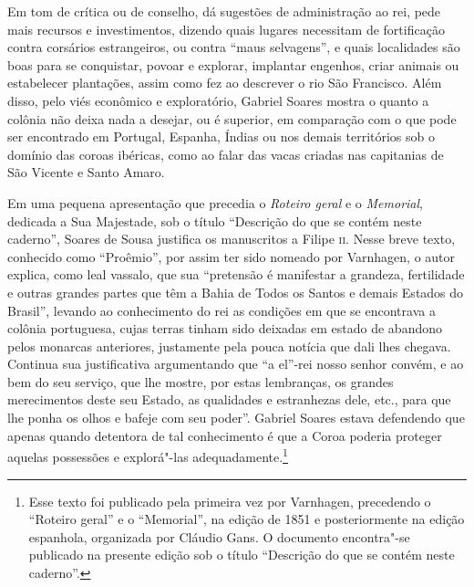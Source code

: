 \documentclass[12pt]{extarticle}
\begin{document}
Em tom de crítica ou de conselho, dá sugestões de administração ao rei, pede mais recursos e investimentos, dizendo quais lugares necessitam de fortificação contra corsários estrangeiros, ou contra ``maus selvagens'', e quais localidades são boas para se conquistar, povoar e explorar, implantar engenhos, criar animais ou estabelecer plantações, assim como fez ao descrever o rio São Francisco.
Além disso, pelo viés econômico e exploratório, Gabriel Soares mostra o quanto a colônia não deixa nada a desejar, ou é superior, em comparação com o que pode ser encontrado em Portugal, Espanha, Índias ou nos demais territórios sob o domínio das coroas ibéricas, como ao falar das vacas criadas nas capitanias de São Vicente e Santo Amaro. 




Em uma pequena apresentação que precedia o \textit{Roteiro geral} e o
\textit{Memorial}, dedicada a Sua Majestade, sob o título ``Descrição do
que se contém neste caderno'', Soares de Sousa justifica os manuscritos a
Filipe 	\textsc{ii}. Nesse breve texto, conhecido como ``Proêmio'', por assim ter
sido nomeado por Varnhagen, o autor explica, como leal vassalo, que sua
``pretensão é manifestar a grandeza, fertilidade e outras grandes partes
que têm a Bahia de Todos os Santos e demais Estados do Brasil'', levando
ao conhecimento do rei as condições em que se encontrava a colônia
portuguesa, cujas terras tinham sido deixadas em estado de abandono
pelos monarcas anteriores, justamente pela pouca notícia que dali lhes
chegava. Continua sua justificativa argumentando que ``a el''-rei nosso
senhor convém, e ao bem do seu serviço, que lhe mostre, por estas
lembranças, os grandes merecimentos deste seu Estado, as qualidades e
estranhezas dele, etc., para que lhe ponha os olhos e bafeje com seu
poder''. Gabriel Soares estava defendendo que apenas quando detentora de
tal conhecimento é que a Coroa poderia proteger aquelas possessões e
explorá"-las adequadamente.\footnote{Esse texto foi publicado pela
primeira vez por Varnhagen, precedendo o “Roteiro geral” e o
“Memorial”, na edição de 1851 e posteriormente na edição espanhola,
organizada por Cláudio Gans. O documento encontra"-se publicado na presente edição
sob o título “Descrição do que se contém neste caderno”.}
\end{document}

